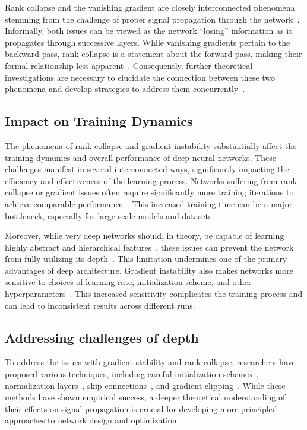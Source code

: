 Rank collapse and the vanishing gradient are closely interconnected phenomena stemming from the challenge of proper signal propagation through the network~\cite{daneshmand2020batch, hanin2018neural}. Informally, both issues can be viewed as the network ``losing'' information as it propagates through successive layers. While vanishing gradients pertain to the backward pass, rank collapse is a statement about the forward pass, making their formal relationship less apparent~\cite{pennington2017resurrecting}. Consequently, further theoretical investigations are necessary to elucidate the connection between these two phenomena and develop strategies to address them concurrently~\cite{yang2018a, hanin2018start}.

\subsection{Impact on Training Dynamics}
The phenomena of rank collapse and gradient instability substantially affect the training dynamics and overall performance of deep neural networks. These challenges manifest in several interconnected ways, significantly impacting the efficiency and effectiveness of the learning process. Networks suffering from rank collapse or gradient issues often require significantly more training iterations to achieve comparable performance~\cite{ioffe2015batch,santurkar2018does,daneshmand2020batch,daneshmand2021batch}. This increased training time can be a major bottleneck, especially for large-scale models and datasets.

Moreover, while very deep networks should, in theory, be capable of learning highly abstract and hierarchical features~\cite{bengio2007scaling,zeiler2014visualizing}, these issues can prevent the network from fully utilizing its depth~\cite{he2016deep,huang2017densely}. This limitation undermines one of the primary advantages of deep architecture. Gradient instability also makes networks more sensitive to choices of learning rate, initialization scheme, and other hyperparameters~\cite{zhang2019fixup,luo2019adaptive}. This increased sensitivity complicates the training process and can lead to inconsistent results across different runs.

\subsection{Addressing challenges of depth}

To address the issues with gradient stability and rank collapse, researchers have proposed various techniques, including careful initialization schemes~\cite{glorot2010understanding,he2015delving}, normalization layers~\cite{ioffe2015batch,ba2016layer}, skip connections~\cite{he2016deep,huang2017densely}, and gradient clipping~\cite{pascanu2013difficulty,zhang2019gradient}. While these methods have shown empirical success, a deeper theoretical understanding of their effects on signal propagation is crucial for developing more principled approaches to network design and optimization~\cite{saxe2013exact,pennington2017resurrecting,yang2018a}.

